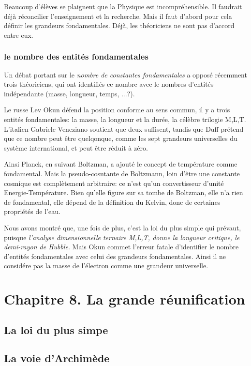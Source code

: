 \documentclass[a4paper,12pt]{article}
\begin{document}
Beaucoup d'élèves se plaignent que la Physique est incompréhensible. Il faudrait déjà réconcilier l'enseignement et la recherche. Mais il faut d'abord pour cela définir les grandeurs fondamentales. Déjà, les théoriciens ne sont pas d'accord entre eux. 

\subsubsection{le nombre des entités fondamentales}

Un débat portant sur le \textit{nombre de constantes fondamentales} a opposé récemment trois théoriciens, qui ont identifiés ce nombre avec le nombres d'entités indépendante (masse, longueur, temps, ...?). 

Le russe Lev Okun défend la position conforme au sens commun, il y a trois entités fondamentales: la masse, la longueur et la durée, la célèbre trilogie M,L,T. L'italien Gabriele Veneziano soutient que deux suffisent, tandis que Duff prétend que ce nombre peut être quelqonque, comme les sept grandeurs universelles du système international, et peut être réduit à zéro. 

Ainsi Planck, en suivant Boltzman, a ajouté le concept de température comme fondamental. Mais la pseudo-cosntante de Boltzmann, loin d'être une constante cosmique est complètement arbitraire: ce n'est qu'un convertisseur d'unité Energie-Température. Bien qu'elle figure sur sa tombe de Boltzman, elle n'a rien de fondamental, elle dépend de la définition du Kelvin, donc de certaines propriétés de l'eau.

Nous avons montré que, une fois de plus, c'est la loi du plus simple qui prévaut, puisque \textit{l'analyse dimensionnelle ternaire M,L,T, donne la longueur critique, le demi-rayon de Hubble}. Mais Okun commet l'erreur fatale d'identifier le nombre d'entités fondamentales avec celui des grandeurs fondamentales. Ainsi il ne considére pas la masse de l'électron comme une grandeur universelle.





\section{Chapitre 8. La grande réunification}
\subsection{La loi du plus simpe}
\subsection{La voie d'Archimède}
\end{document}
